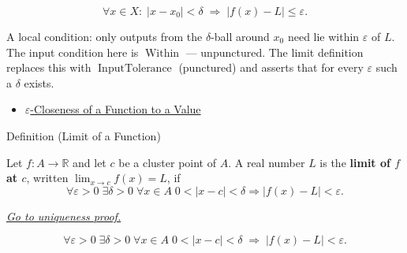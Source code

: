 \begin{remark*}
\[
  \forall x \in X :\;
  |x - x_0| < \delta \;\Rightarrow\; |f(x) - L| \leq \varepsilon.
\]
\end{remark*}

\begin{remark*}[Interpretation]
A local condition: only outputs from the $\delta$-ball around $x_0$
need lie within $\varepsilon$ of $L$. The input condition here is
$\operatorname{Within}$ — unpunctured. The limit definition replaces
this with $\operatorname{InputTolerance}$ (punctured) and asserts
that for every $\varepsilon$ such a $\delta$ exists.
\end{remark*}

\begin{dependencies}
\begin{itemize}
  \item \hyperref[def:eps-close-function]{$\varepsilon$-Closeness of a Function to a Value}
\end{itemize}
\end{dependencies}


\begin{definitionbox}{Definition (Limit of a Function)}
\begin{definition}
\label{def:limit-function}
Let $f : A \to \mathbb{R}$ and let $c$ be a cluster point of $A$.
A real number $L$ is the \textbf{limit of $f$ at $c$}, written
$\lim_{x \to c} f(x) = L$, if
\[
  \forall\varepsilon>0\;\exists\delta>0\;\forall x\in A\;
  0<|x-c|<\delta\Rightarrow |f(x)-L|<\varepsilon.
\]

\smallskip\noindent
\hyperref[prf:limit-unique]{\textit{Go to uniqueness proof.}}
\end{definition}
\end{definitionbox}

\begin{remark*}
\[
  \forall\varepsilon > 0\;\exists\delta > 0\;\forall x \in A\;
  0 < |x - c| < \delta
  \;\Rightarrow\;
  |f(x) - L| < \varepsilon.
\]
\end{remark*}

